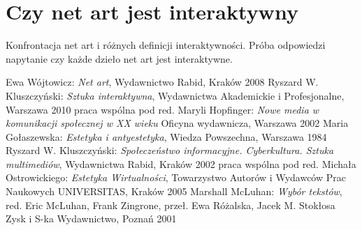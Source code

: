 \documentclass[a4paper,12pt,twoside]{article}
\begin{document}
\section{Czy net art jest interaktywny}
Konfrontacja net art i różnych definicji interaktywności.
Próba odpowiedzi napytanie czy każde dzieło net art jest
interaktywne.


\begin{thebibliography}{6}
  Ewa Wójtowicz:
  \textit{Net art},
  Wydawnictwo Rabid, Kraków 2008
  Ryszard W. Kluszczyński:
  \textit{Sztuka interaktywna},
  Wydawnictwa Akademickie i Profesjonalne,
  Warszawa 2010
  praca wspólna pod red. Maryli Hopfinger:
  \textit{Nowe media w komunikacji społecznej w XX wieku}
  Oficyna wydawnicza,
  Warszawa 2002
  Maria Gołaszewska:
  \textit{Estetyka i antyestetyka},
  Wiedza Powszechna, Warszawa 1984
  Ryszard W. Kluszczyński:
  \textit{Społeczeństwo informacyjne. Cyberkultura. Sztuka multimediów},
  Wydawnictwa Rabid, Kraków 2002
  praca wspólna pod red. Michała Ostrowickiego:
  \textit{Estetyka Wirtualności},
  Towarzystwo Autorów i Wydawców Prac Naukowych UNIVERSITAS,
  Kraków 2005
  Marshall McLuhan:
  \textit{Wybór tekstów},
  red. Eric McLuhan, Frank Zingrone,
  przeł. Ewa Różalska, Jacek M. Stokłosa
  Zysk i S-ka Wydawnictwo, Poznań 2001


\end{thebibliography}
\end{document}
